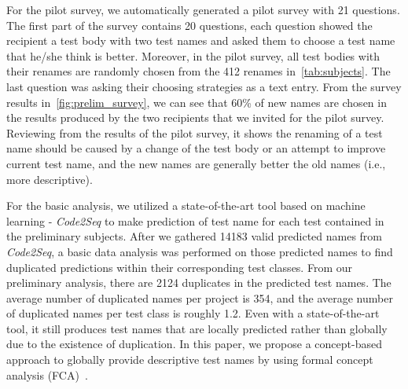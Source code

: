 \documentclass[proposal.tex]{subfiles}
\begin{document}
For the pilot survey, we automatically generated a pilot survey with 21 questions.
%
The first part of the survey contains 20 questions, each question showed the recipient a test body with two test names and asked them to choose a test name that he/she think is better.
%
Moreover, in the pilot survey, all test bodies with their renames are randomly chosen from the \num{412} renames in~\cref{tab:subjects}.
%
The last question was asking their choosing strategies as a text entry.
%
From the survey results in~\cref{fig:prelim_survey}, we can see that \num{60}\% of new names are chosen in the results produced by the two recipients that we invited for the pilot survey.
%
Reviewing from the results of the pilot survey, it shows the renaming of a test name should be caused by a change of the test body or an attempt to improve current test name, and the new names are generally better the old names (i.e., more descriptive).


For the basic analysis, we utilized a state-of-the-art tool based on machine learning - \textit{Code2Seq} to make prediction of test name for each test contained in the preliminary subjects.
%
After we gathered \num{14183} valid predicted names from \textit{Code2Seq}, a basic data analysis was performed on those predicted names to find duplicated predictions within their corresponding test classes.
%
From our preliminary analysis, there are \num{2124} duplicates in the predicted test names.
%
The average number of duplicated names per project is \num{354}, and the average number of duplicated names per test class is roughly \num{1.2}.
%
Even with a state-of-the-art tool, it still produces test names that are locally predicted rather than globally due to the existence of duplication.
%
In this paper, we propose a concept-based approach to globally provide descriptive test names by using formal concept analysis (FCA)~\cite{tonella2004formal}.
\end{document}
